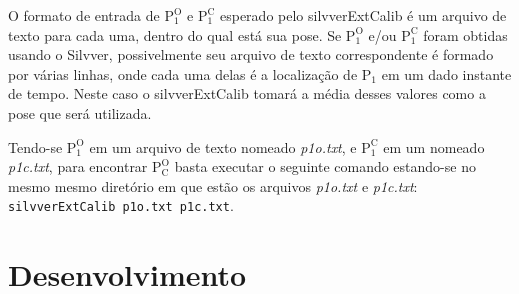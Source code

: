 \documentclass[a4paper,10pt]{article}
\begin{document}
O formato de entrada de $\mathrm{P_1^O}$ e $\mathrm{P_1^C}$ esperado pelo
silvverExtCalib é um arquivo de texto para cada uma, dentro do qual está sua
pose. Se $\mathrm{P_1^O}$ e/ou $\mathrm{P_1^C}$ foram obtidas usando o
Silvver, possivelmente seu arquivo de texto correspondente é formado por
várias linhas, onde cada uma delas é a localização de $\mathrm{P_1}$ em um
dado instante de tempo. Neste caso o silvverExtCalib tomará a média desses
valores como a pose que será utilizada.

Tendo-se $\mathrm{P_1^O}$ em um arquivo de texto nomeado \emph{p1o.txt}, e
$\mathrm{P_1^C}$ em um nomeado \emph{p1c.txt}, para encontrar $\mathrm{P_C^O}$
basta executar o seguinte comando estando-se no mesmo mesmo diretório em que
estão os arquivos \emph{p1o.txt} e \emph{p1c.txt}: \texttt{silvverExtCalib
  p1o.txt p1c.txt}.

\section{Desenvolvimento}




\end{document}
